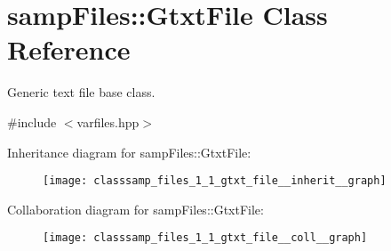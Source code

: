 \hypertarget{classsamp_files_1_1_gtxt_file}{}\section{samp\+Files\+:\+:Gtxt\+File Class Reference}
\label{classsamp_files_1_1_gtxt_file}


Generic text file base class.  




{\ttfamily \#include $<$varfiles.\+hpp$>$}



Inheritance diagram for samp\+Files\+:\+:Gtxt\+File\+:\nopagebreak
\begin{figure}[H]
\begin{center}
\leavevmode
\texttt{[image: classsamp\_files\_1\_1\_gtxt\_file\_\_inherit\_\_graph]}
\end{center}
\end{figure}


Collaboration diagram for samp\+Files\+:\+:Gtxt\+File\+:\nopagebreak
\begin{figure}[H]
\begin{center}
\leavevmode
\texttt{[image: classsamp\_files\_1\_1\_gtxt\_file\_\_coll\_\_graph]}
\end{center}
\end{figure}
